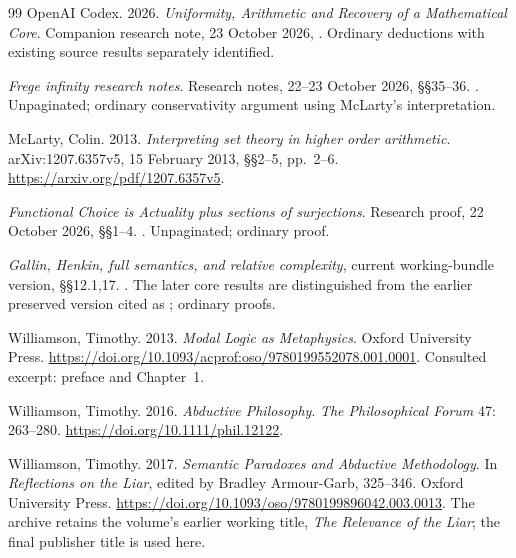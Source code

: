 \documentclass[11pt]{article}
\begin{document}
\begin{thebibliography}{99}
OpenAI Codex. 2026. \emph{Uniformity, Arithmetic and Recovery of a Mathematical Core}.
Companion research note, 23 October 2026, .
Ordinary deductions with existing source results separately identified.

\emph{Frege infinity research notes}. Research notes, 22--23 October 2026,
\S\S35--36.
.
Unpaginated; ordinary conservativity argument using McLarty's interpretation.

McLarty, Colin. 2013.
\emph{Interpreting set theory in higher order arithmetic}.
arXiv:1207.6357v5, 15 February 2013, \S\S2--5, pp.~2--6.
\url{https://arxiv.org/pdf/1207.6357v5}.

\emph{Functional Choice is Actuality plus sections of surjections}.
Research proof, 22 October 2026, \S\S1--4.
.
Unpaginated; ordinary proof.

\emph{Gallin, Henkin, full semantics, and relative complexity},
current working-bundle version, \S\S12.1,17.
.
The later core results are distinguished from the earlier preserved version
cited as \citet{gallinnotes}; ordinary proofs.

Williamson, Timothy. 2013. \emph{Modal Logic as Metaphysics}.
Oxford University Press.
\url{https://doi.org/10.1093/acprof:oso/9780199552078.001.0001}.
Consulted excerpt: preface and Chapter~1.

Williamson, Timothy. 2016. \emph{Abductive Philosophy}.
\emph{The Philosophical Forum} 47: 263--280.
\url{https://doi.org/10.1111/phil.12122}.

Williamson, Timothy. 2017.
\emph{Semantic Paradoxes and Abductive Methodology}.
In \emph{Reflections on the Liar}, edited by Bradley Armour-Garb,
325--346. Oxford University Press.
\url{https://doi.org/10.1093/oso/9780199896042.003.0013}.
The archive retains the volume's earlier working title,
\emph{The Relevance of the Liar}; the final publisher title is used here.
\end{thebibliography}
\end{document}
